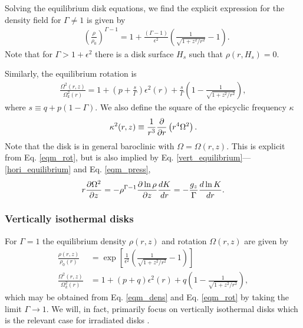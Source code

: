 Solving the equilibrium disk equations, we find the explicit
expression for the density field for 
$\Gamma\neq1$ is given  by
\begin{align}\label{eqm_dens}
  &\left(\frac{\rho}{\rho_0}\right)^{\Gamma-1} = 1 +
  \frac{\left(\Gamma-1\right)}{\epsilon^2}\left(\frac{1}{\sqrt{1+z^2/r^2}}-1\right).
\end{align}
Note that for $\Gamma > 1 + \epsilon^2$ there is a disk surface $H_s$
such that $\rho(r,H_s)=0$. 

Similarly, the equilibrium rotation is 
\begin{align}\label{eqm_rot}
  \frac{\Omega^2(r,z)}{\Omega_k^2(r)}=1 +
  \left(p+\frac{s}{\Gamma}\right)\epsilon^2(r) 
  +\frac{s}{\Gamma} \left(1-\frac{1}{\sqrt{1+z^2/r^2}}\right), 
\end{align}
where $s\equiv q+p(1-\Gamma)$. We also define %
the square of the epicyclic frequency $\kappa$ 
\begin{align}
  \kappa^2(r,z) \equiv \frac{1}{r^3}\frac{\p }{\p
    r}\left(r^4\Omega^2\right). %
\end{align}
Note that the disk is in general baroclinic with $\Omega =
\Omega(r,z)$. This is explicit from Eq. \ref{eqm_rot}, but is also
implied by Eq. \ref{vert_equilibrium}---\ref{hori_equilibrium} and 
Eq. \ref{eqm_press},  
\begin{align}
  r\frac{\partial\Omega^2}{\partial z} = - \rho^{\Gamma-1}\frac{\partial\ln\rho}{\partial
    z}\frac{dK}{dr} = - \frac{g_z}{\Gamma}\frac{d\ln K}{dr}.\label{vertical_shear}
\end{align}

\subsubsection{Vertically isothermal disks}
For $\Gamma=1$ the equilibrium density $\rho(r,z)$ and rotation
$\Omega(r,z)$ are given by 
\begin{align}
  \frac{\rho(r,z)}{\rho_0(r)} &=
  \exp{\left[\frac{1}{\epsilon^2}\left(\frac{1}{\sqrt{1+z^2/r^2}}-1\right)\right]}\\    
  \frac{\Omega^2(r,z)}{\Omega_k^2(r)}& =1+ (p+q)\epsilon^2(r) + q\left(1 -
    \frac{1}{\sqrt{1+z^2/r^2}}\right),\label{vertiso_eqm}
\end{align}
which may be obtained from Eq. \ref{eqm_dens} and Eq. \ref{eqm_rot} by
taking the limit $\Gamma\to 1$. We will, in fact, primarily focus on
vertically isothermal disks which is the relevant case for irradiated
disks \citep{chiang97}. 

